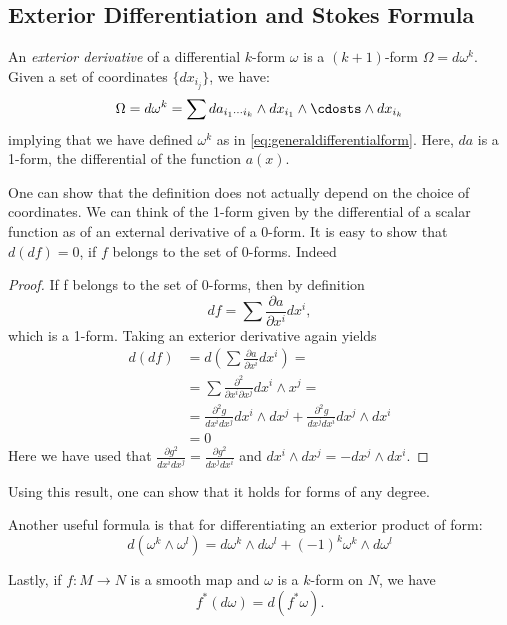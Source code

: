 \subsection{Exterior Differentiation and Stokes Formula}
\begin{definition}
  An \textit{exterior derivative} of a differential $k$-form $\omega$ is
  a $(k+1)$-form $\Omega=d\omega^k$. Given a set of coordinates $\{dx_{i_j}\}$,
  we have:
  \begin{equation}
    \Omega = d\omega^k = \sum{da_{i_1\cdots i_k}\wedge
      dx_{i_1}\wedge\cdosts\wedge dx_{i_k}}
    \end{equation}
    implying that we have defined $\omega^k$ as in
    \eqref{eq:generaldifferentialform}. Here, $da$ is a 1-form, the
    differential of the function $a(x)$.
\end{definition}
One can show that the definition does not actually depend on the choice of
coordinates. We can think of the 1-form given by the differential of a scalar
function as of an external derivative of a 0-form.
It is easy to show that $d(df)=0$, if $f$ belongs to the set of 0-forms. Indeed
\begin{proof}
  If f belongs to the set of 0-forms, then by definition
  \begin{equation}
   df = \sum{\frac{\partial a}{\partial x^i}dx^i},
  \end{equation}
  which is a 1-form. Taking an exterior derivative again yields
  \begin{align}
     d(df) &= d\left(\sum{\frac{\partial a}{\partial x^i}dx^i}\right)=\nonumber\\
    &= \sum{\frac{\partial^2}{\partial x^i\partial x^j}dx^i\wedge x^j}
     =\nonumber\\
    &= \frac{\partial^2 g}{dx^i dx^j}dx^i\wedge dx^j + \frac{\partial^2 g}{dx^j
    dx^i}dx^j\wedge dx^i\nonumber\\
    &= 0
  \end{align}
  Here we have used that $\frac{\partial g^2}{dx^i dx^j} = \frac{\partial
  g^2}{dx^j dx^i}$ and $dx^i\wedge dx^j = -dx^j\wedge dx^i$.
\end{proof}
Using this result, one can show that it holds for forms of any degree.
\par Another useful formula is that for differentiating an exterior product of
form:
\begin{equation}
  d(\omega^k\wedge\omega^l) = d\omega^k\wedge d\omega^l + (-1)^k\omega^k\wedge
  d\omega^l
\end{equation}
\par Lastly, if $f:M\rightarrow N$ is a smooth map and $\omega$ is a $k$-form
on $N$, we have
\begin{equation}
  f^*(d\omega) = d(f^*\omega).
\end{equation}
